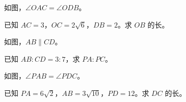 \documentclass{exam-zh}
\begin{document}

\begin{problem}[points=10]
  \noindent
  \begin{minipage}[t]{\dimexpr\linewidth-60mm-6mm\relax}
    \vspace{0pt}
    如图，$\angle OAC=\angle ODB$。

已知 $AC=3$，$OC=2\sqrt{6}$，$DB=2$。求 $OB$ 的长。
    
  \end{minipage}\hfill
  \begin{diagramcoltikz}{60mm}{}
  }
  \end{diagramcoltikz}
  \par\medskip
  \answerarea[54mm]
\end{problem}



\begin{problem}[points=10]
  \noindent
  \begin{minipage}[t]{\dimexpr\linewidth-60mm-6mm\relax}
    \vspace{0pt}
    如图，$AB\parallel CD$。

已知 $AB:CD=3:7$，求 $PA:PC$。
    
  \end{minipage}\hfill
  \begin{diagramcoltikz}{60mm}{}
  }
  \end{diagramcoltikz}
  \par\medskip
  \answerarea[48mm]
\end{problem}



\begin{problem}[points=10]
  \noindent
  \begin{minipage}[t]{\dimexpr\linewidth-60mm-6mm\relax}
    \vspace{0pt}
    如图，$\angle PAB=\angle PDC$。

已知 $PA=6\sqrt{2}$，$AB=3\sqrt{10}$，$PD=12$。求 $DC$ 的长。
    
  \end{minipage}\hfill
  \begin{diagramcoltikz}{60mm}{}
  }
  \end{diagramcoltikz}
  \par\medskip
  \answerarea[54mm]
\end{problem}
\end{document}
